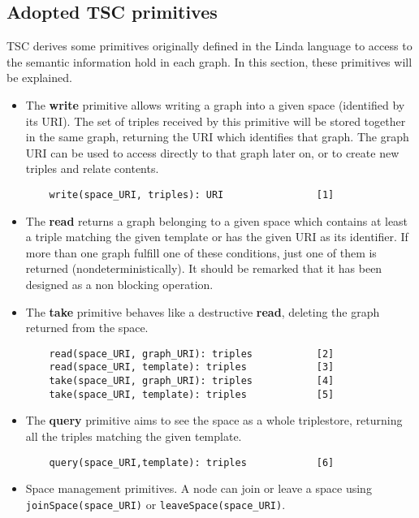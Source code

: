 

\subsection{Adopted TSC primitives}
\label{sec:primitives}

TSC derives some primitives originally defined in the Linda language \citep{gelernter_generative_1985} to access to the semantic information hold in each graph.
In this section, these primitives will be explained.

\begin{itemize}
 \item The \textbf{write} primitive allows writing a graph into a given space (identified by its URI). The set of
triples received by this primitive will be stored together in the same graph, returning the URI which identifies that
graph. The graph URI can be used to access directly to that graph later on, or to create new triples and relate
contents.

  \begin{lstlisting}
    write(space_URI, triples): URI                [1]
  \end{lstlisting}


  \item The \textbf{read} returns a graph belonging to a given space which contains at least a triple matching the given
template or has the given URI as its identifier. If more than one graph fulfill one of these conditions, just one of
them is returned (nondeterministically). It should be remarked that it has been designed as a non blocking operation.
  \item The \textbf{take} primitive behaves like a destructive \textbf{read}, deleting the graph returned from the
space.

  \begin{lstlisting}
    read(space_URI, graph_URI): triples           [2]
    read(space_URI, template): triples            [3]
    take(space_URI, graph_URI): triples           [4]
    take(space_URI, template): triples            [5]
  \end{lstlisting}


  \item The \textbf{query} primitive aims to see the space as a whole triplestore, returning all the triples matching
the given template.
  \begin{lstlisting}
    query(space_URI,template): triples            [6]
  \end{lstlisting}

  \item Space management primitives. A node can join or leave a space using \linebreak \texttt{joinSpace(space\_URI)} or
\texttt{leaveSpace(space\_URI)}.
\end{itemize}



